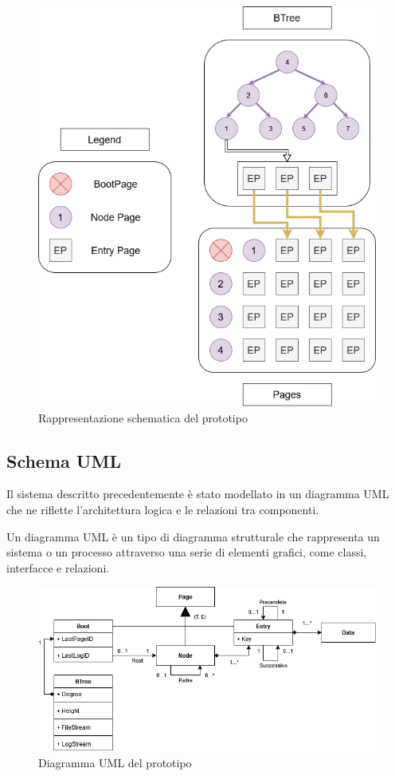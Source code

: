 \documentclass[12pt,a4paper,openright,twoside]{book}
\begin{document}
            \begin{figure} [h]
                \centering
                \includegraphics[width=.45\linewidth]{figures/Prototipo.png}
                \caption{Rappresentazione schematica del prototipo}
                \label{fig:prototipo}
            \end{figure}

        \subsection{Schema UML}

            Il sistema descritto precedentemente è stato modellato in un diagramma UML che ne riflette l’architettura logica e le relazioni tra componenti.

            Un diagramma UML è un tipo di diagramma strutturale che rappresenta un sistema o un processo attraverso una serie di elementi grafici, come classi, interfacce e relazioni.

            \begin{figure} [h]
                \centering
                \includegraphics[width=1\linewidth]{figures/UML.png}
                \caption{Diagramma UML del prototipo}
                \label{fig:uml}
            \end{figure}
\end{document}
